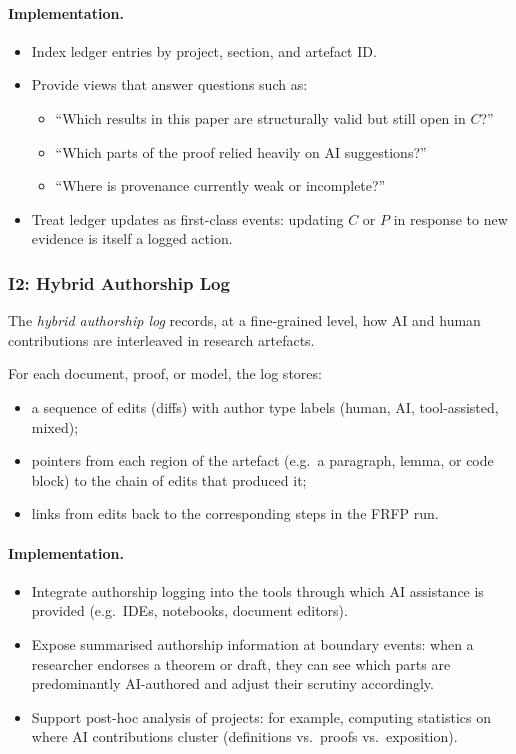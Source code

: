 \paragraph{Implementation.}

\begin{itemize}
  \item Index ledger entries by project, section, and artefact ID.
  \item Provide views that answer questions such as:
        \begin{itemize}
          \item ``Which results in this paper are structurally valid but still
                open in $C$?''
          \item ``Which parts of the proof relied heavily on AI suggestions?''
          \item ``Where is provenance currently weak or incomplete?''
        \end{itemize}
  \item Treat ledger updates as first-class events: updating $C$ or $P$
        in response to new evidence is itself a logged action.
\end{itemize}

\subsubsection*{I2: Hybrid Authorship Log}

The \emph{hybrid authorship log} records, at a fine-grained level, how AI and
human contributions are interleaved in research artefacts.

For each document, proof, or model, the log stores:

\begin{itemize}
  \item a sequence of edits (diffs) with author type labels
        (human, AI, tool-assisted, mixed);
  \item pointers from each region of the artefact (e.g.\ a paragraph, lemma,
        or code block) to the chain of edits that produced it;
  \item links from edits back to the corresponding steps in the FRFP run.
\end{itemize}

\paragraph{Implementation.}

\begin{itemize}
  \item Integrate authorship logging into the tools through which AI assistance
        is provided (e.g.\ IDEs, notebooks, document editors).
  \item Expose summarised authorship information at boundary events:
        when a researcher endorses a theorem or draft, they can see which parts
        are predominantly AI-authored and adjust their scrutiny accordingly.
  \item Support post-hoc analysis of projects: for example, computing statistics
        on where AI contributions cluster (definitions vs.\ proofs vs.\ exposition).
\end{itemize}

